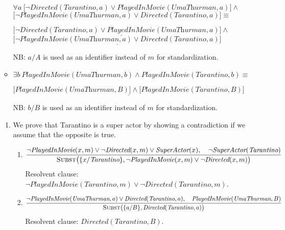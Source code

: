 \begin{enumerate}
\begin{itemize}
$\forall a ~ \big[ \neg \textit{Directed}(\textit{Tarantino}, a) \lor \textit{PlayedInMovie}(\textit{UmaThurman}, a) \big] \land$\\
$\big[ \neg \textit{PlayedInMovie}(\textit{UmaThurman}, a) \lor \textit{Directed}(\textit{Tarantino}, a) \big] \equiv$

$\underline{\big[ \neg \textit{Directed}(\textit{Tarantino}, a) \lor \textit{PlayedInMovie}(\textit{UmaThurman}, a) \big] \land}$\\
$\underline{\big[ \neg \textit{PlayedInMovie}(\textit{UmaThurman}, a) \lor \textit{Directed}(\textit{Tarantino}, a) \big]}$

NB: $a / A$ is used as an identifier instead of $m$ for standardization.

\item
$\exists b ~ \textit{PlayedInMovie}(\textit{UmaThurman}, b) \land \textit{PlayedInMovie}(\textit{Tarantino}, b) \equiv$

$\underline{\big[ \textit{PlayedInMovie}(\textit{UmaThurman}, B) \big] \land \big[ \textit{PlayedInMovie}(\textit{Tarantino}, B) \big]}$

NB: $b / B$ is used as an identifier instead of $m$ for standardization.
\end{itemize}

\begin{enumerate}
\item
We prove that Tarantino is a super actor by showing a contradiction if we assume that the opposite is true.
\begin{enumerate}
\item
{\footnotesize
\begin{displaymath}
\frac{\neg \textit{PlayedInMovie}(x, m) \lor \neg \textit{Directed}(x, m) \lor \textit{SuperActor}(x), \quad \neg \textit{SuperActor}(\textit{Tarantino})}{\textsc{Subst}\big(\{x / \textit{Tarantino}\}, \neg \textit{PlayedInMovie}(x, m) \lor \neg \textit{Directed}(x, m)\big)}
\end{displaymath}
}
Resolvent clause: $\neg \textit{PlayedInMovie}(\textit{Tarantino}, m) \lor \neg \textit{Directed}(\textit{Tarantino}, m)$.

\item
{\footnotesize
\begin{displaymath}
\frac{\neg \textit{PlayedInMovie}(\textit{UmaThurman}, a) \lor \textit{Directed}(\textit{Tarantino}, a), \quad \textit{PlayedInMovie}(\textit{UmaThurman}, B)}{\textsc{Subst}\big(\{ a / B\}, \textit{Directed}(\textit{Tarantino}, a)  \big)}
\end{displaymath}
}
Resolvent clause: $\textit{Directed}(\textit{Tarantino}, B)$.


\end{enumerate}
\end{enumerate}
\end{enumerate}
